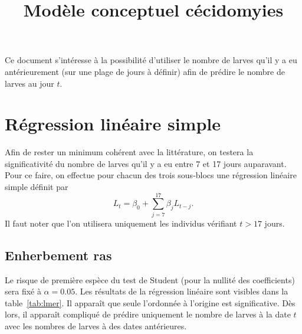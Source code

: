 \documentclass[a4paper, 11pt]{article}
\title{Modèle conceptuel cécidomyies}
\author{}
\date{}
\begin{document}
\maketitle 

Ce document s'intéresse à la possibilité d'utiliser le nombre de larves qu'il y a eu antérieurement (sur une plage de jours à définir) afin de prédire le nombre de larves au jour $t$.

\section{Régression linéaire simple}

Afin de rester un minimum cohérent avec la littérature, on testera la significativité du nombre de larves qu'il y a eu entre 7 et 17 jours auparavant. Pour ce faire, on effectue pour chacun des trois sous-blocs une régression linéaire simple définit par
$$ L_t = \beta_0 + \sum_{j=7}^{17} \beta_{j} L_{t-j}.$$
Il faut noter que l'on utilisera uniquement les individus vérifiant $t > 17$ jours.

\subsection{Enherbement ras}

Le risque de première espèce du test de Student (pour la nullité des coefficients) sera fixé à $\alpha = 0.05$.
Les résultats de la régression linéaire sont visibles dans la table~\ref{tab:lmer}. Il apparaît que seule l'ordonnée à l'origine est significative. Dès lors, il apparaît compliqué de prédire uniquement le nombre de larves à la date $t$ avec les nombres de larves à des dates antérieures.
\end{document}
